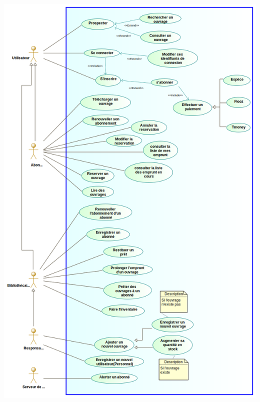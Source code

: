 \documentclass[12pt,a4paper]{article}
\begin{document}
\includegraphics[scale=0.5]{images/UC.png}
\end{document}

